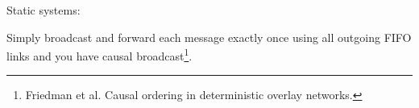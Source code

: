 \documentclass[10pt, xcolor={usenames, dvipsnames}]{beamer}
\newcommand{\cmark}{\ding{51}}
\newcommand{\YES}[1]{\textcolor{green}{#1}}
\begin{document}
  




\begin{frame}{Static systems: \YES{\cmark}}
  
  \vspace{2em}
  
  Simply broadcast and forward each message exactly once using all outgoing FIFO
  links and you have causal broadcast\footnote{Friedman et al. Causal ordering
    in deterministic overlay networks.}.

  \begin{minipage}{0.32\textwidth}
    \begin{center}
      
    \end{center}
  \end{minipage}
  \begin{minipage}{0.32\textwidth}
    \begin{center}
      
    \end{center}
  \end{minipage}
  \begin{minipage}{0.32\textwidth}
    \begin{center}
      
    \end{center}
  \end{minipage}
  
  \begin{center}
  \begin{minipage}{0.35\textwidth}
    \begin{center}
      
    \end{center}
  \end{minipage}
  \begin{minipage}{0.35\textwidth}
    \begin{center}
      
    \end{center}
  \end{minipage}
  \end{center}


\end{frame}
\end{document}
